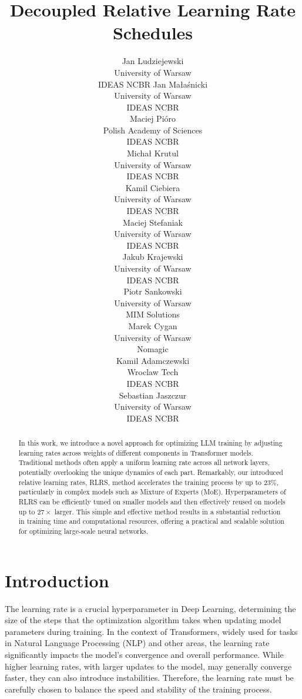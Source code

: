 \documentclass{article} %
\title{Decoupled Relative Learning Rate Schedules}
\author{%
    Jan Ludziejewski \\
    University of Warsaw \\
    IDEAS NCBR 
    \And Jan Małaśnicki \\
    University of Warsaw \\
    IDEAS NCBR \\
    \And Maciej Pióro \\
    Polish Academy of Sciences \\
    IDEAS NCBR \\
    \And Michał Krutul \\
    University of Warsaw \\
    IDEAS NCBR \\
    \And Kamil Ciebiera \\
    University of Warsaw \\
    IDEAS NCBR \\
    \And Maciej Stefaniak \\
    University of Warsaw \\
    IDEAS NCBR \\
    \And Jakub Krajewski \\
    University of Warsaw \\
    IDEAS NCBR \\
    \And Piotr Sankowski \\
    University of Warsaw \\
    MIM Solutions \\
    \And Marek Cygan \\
    University of Warsaw \\
    Nomagic \\
    \And Kamil Adamczewski \\
    Wroclaw Tech\\
    IDEAS NCBR \\
    \And Sebastian Jaszczur \\
    University of Warsaw \\
    IDEAS NCBR \\
    }
\newcommand{\comment}[1]{\textcolor{red}{#1}}
\newcommand{\sj}[1]{\textcolor{blue}{[SJ: #1]}}
\newcommand{\jmr}[2]{\textcolor{purple}{[JM:] \sout{#1} #2}}
\begin{document}
    \maketitle

    \begin{abstract}
    In this work, we introduce a novel  approach for optimizing LLM training by adjusting learning rates across weights of different components in Transformer models. Traditional methods often apply a uniform learning rate across all network layers, potentially overlooking the unique dynamics of each part. Remarkably, our introduced relative learning rates, RLRS, method accelerates the training process by up to {$23\%$}, particularly in complex models such as Mixture of Experts (MoE). Hyperparameters of RLRS can be efficiently tuned on smaller models and then effectively reused on models up to $27\times$ larger. This simple and effective method results in a substantial reduction in training time and computational resources, offering a practical and scalable solution for optimizing large-scale neural networks.
    \end{abstract}
    \section{Introduction}

    The learning rate is a crucial hyperparameter in Deep Learning, determining the size of the steps that the optimization algorithm takes when updating model parameters during training. In the context of Transformers, widely used for tasks in Natural Language Processing (NLP) and other areas, the learning rate significantly impacts the model's convergence and overall performance. While higher learning rates, with larger updates to the model, may generally converge faster, they can also introduce instabilities. Therefore, the learning rate must be carefully chosen to balance the speed and stability of the training process.
\end{document}
